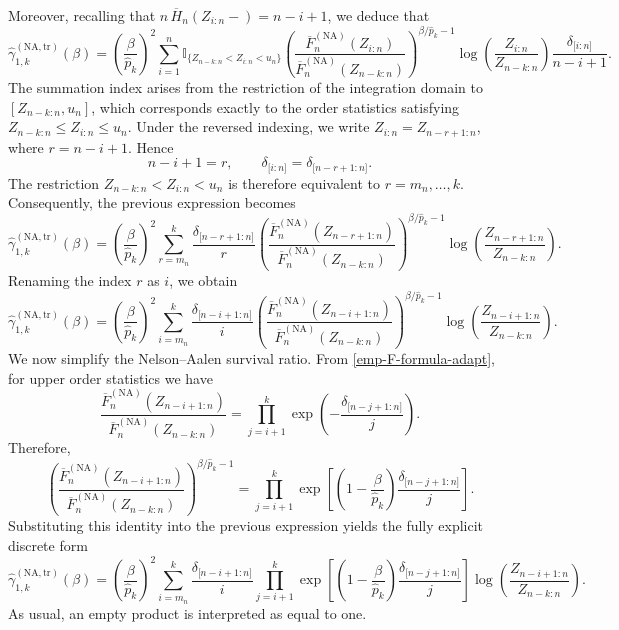 \documentclass[reqno,openbib,runningheads,a4paper,12pt]{amsart}%
\begin{document}
Moreover, recalling that $n\,\overline{H}_{n}(Z_{i:n}-)=n-i+1$, we deduce
that
\[
\widehat{\gamma}_{1,k}^{(\mathrm{NA,tr})}(\beta)=\left(  \frac{\beta
}{\widehat{p}_{k}}\right)  ^{2}\sum_{i=1}^{n}\mathbb{I}_{\{Z_{n-k:n}%
<Z_{i:n}<u_{n}\}}\left(  \frac{\overline{F}_{n}^{(\mathrm{NA})}(Z_{i:n}%
)}{\overline{F}_{n}^{(\mathrm{NA})}(Z_{n-k:n})}\right)  ^{\beta/\widehat{p}%
_{k}-1}\log\!\left(  \frac{Z_{i:n}}{Z_{n-k:n}}\right)  \frac{\delta_{\lbrack
i:n]}}{n-i+1}.
\]
The summation index arises from the restriction of the integration domain to
$[Z_{n-k:n},u_{n}]$, which corresponds exactly to the order statistics
satisfying $Z_{n-k:n}\leq Z_{i:n}\leq u_{n}$. \noindent Under the reversed
indexing, we write $Z_{i:n}=Z_{n-r+1:n}$, where $r=n-i+1$. Hence
\[
n-i+1=r,\qquad\delta_{\lbrack i:n]}=\delta_{\lbrack n-r+1:n]}.
\]
The restriction $Z_{n-k:n}<Z_{i:n}<u_{n}$ is therefore equivalent to
$r=m_{n},\ldots,k$. Consequently, the previous expression becomes
\[
\widehat{\gamma}_{1,k}^{(\mathrm{NA,tr})}(\beta)=\left(  \frac{\beta
}{\widehat{p}_{k}}\right)  ^{2}\sum_{r=m_{n}}^{k}\frac{\delta_{\lbrack
n-r+1:n]}}{r}\left(  \frac{\overline{F}_{n}^{(\mathrm{NA})}(Z_{n-r+1:n}%
)}{\overline{F}_{n}^{(\mathrm{NA})}(Z_{n-k:n})}\right)  ^{\beta/\widehat{p}%
_{k}-1}\log\!\left(  \frac{Z_{n-r+1:n}}{Z_{n-k:n}}\right)  .
\]
Renaming the index $r$ as $i$, we obtain
\[
\widehat{\gamma}_{1,k}^{(\mathrm{NA,tr})}(\beta)=\left(  \frac{\beta
}{\widehat{p}_{k}}\right)  ^{2}\sum_{i=m_{n}}^{k}\frac{\delta_{\lbrack
n-i+1:n]}}{i}\left(  \frac{\overline{F}_{n}^{(\mathrm{NA})}(Z_{n-i+1:n}%
)}{\overline{F}_{n}^{(\mathrm{NA})}(Z_{n-k:n})}\right)  ^{\beta/\widehat{p}%
_{k}-1}\log\!\left(  \frac{Z_{n-i+1:n}}{Z_{n-k:n}}\right)  .
\]
We now simplify the Nelson--Aalen survival ratio. From
\eqref{emp-F-formula-adapt}, for upper order statistics we have
\[
\frac{\overline{F}_{n}^{(\mathrm{NA})}(Z_{n-i+1:n})}{\overline{F}%
_{n}^{(\mathrm{NA})}(Z_{n-k:n})}=\prod_{j=i+1}^{k}\exp\!\left(  -\frac
{\delta_{\lbrack n-j+1:n]}}{j}\right)  .
\]
Therefore,
\[
\left(  \frac{\overline{F}_{n}^{(\mathrm{NA})}(Z_{n-i+1:n})}{\overline{F}%
_{n}^{(\mathrm{NA})}(Z_{n-k:n})}\right)  ^{\beta/\widehat{p}_{k}-1}%
=\prod_{j=i+1}^{k}\exp\!\left[  \left(  1-\frac{\beta}{\widehat{p}_{k}%
}\right)  \frac{\delta_{\lbrack n-j+1:n]}}{j}\right]  .
\]
Substituting this identity into the previous expression yields the fully
explicit discrete form
\[
\widehat{\gamma}_{1,k}^{(\mathrm{NA,tr})}(\beta)=\left(  \frac{\beta
}{\widehat{p}_{k}}\right)  ^{2}\sum_{i=m_{n}}^{k}\frac{\delta_{\lbrack
n-i+1:n]}}{i}\prod_{j=i+1}^{k}\exp\!\left[  \left(  1-\frac{\beta}%
{\widehat{p}_{k}}\right)  \frac{\delta_{\lbrack n-j+1:n]}}{j}\right]
\log\!\left(  \frac{Z_{n-i+1:n}}{Z_{n-k:n}}\right)  .
\]
As usual, an empty product is interpreted as equal to one.
\end{document}
